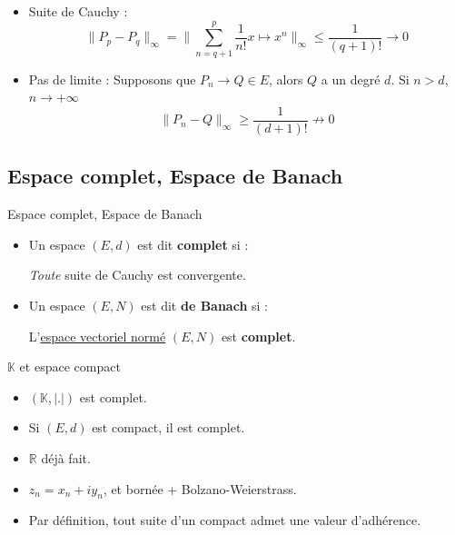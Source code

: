 \begin{myproof}
\begin{itemize}
    \item Suite de Cauchy :\[
     \| P_p - P_q  \| _{\infty} =  \| \sum_{n=q+1}^{p} \frac{1}{n!} x \mapsto x^{n} \| _{\infty} \le  \frac{1}{(q+1)!}  \to 0
    \]
\item Pas de limite : Supposons que $P_n \to Q \in E$, alors $Q$ a un degré $d$. Si  $n>d$, $n \to +\infty$
     \[
     \| P_n - Q  \| _\infty \ge  \frac{1}{(d+1)!}  \not\to 0
    \]
\end{itemize}
\end{myproof}

\subsection{Espace complet, Espace de Banach}
\begin{Definition}[colbacktitle=red!75!black]{Espace complet, Espace de Banach}{}
\begin{itemize}
    \item Un espace $(E,d)$ est dit \textbf{complet} si :
      \begin{center}
        \textit{Toute} suite de Cauchy est convergente.
      \end{center}
    \item Un espace $(E,N)$ est dit \textbf{de Banach} si :
      \begin{center}
          L'\underline{espace vectoriel normé} $(E,N)$ est \textbf{complet}.
      \end{center}
\end{itemize}
\end{Definition}

\begin{Example}{$\mathbb{K}$ et espace compact}{}
\begin{itemize}
  \item $(\mathbb{K}, |.|)$ est complet.
  \item Si $(E,d)$ est compact, il est complet.
\end{itemize}
\end{Example}

\begin{myproof}{}{}
\begin{itemize}
  \item $\mathbb{R}$ déjà fait.
  \item $z_n = x_n + iy_n$, et bornée + Bolzano-Weierstrass.
  \item Par définition, tout suite d'un compact admet une valeur d'adhérence.
\end{itemize}
\end{myproof}

